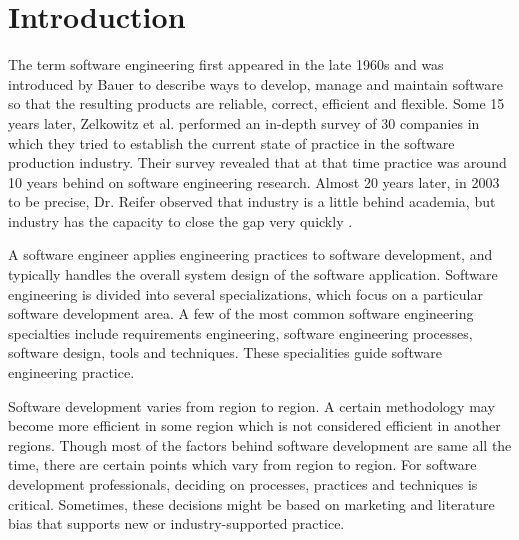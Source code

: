 \section{Introduction}
\label{sec:introduction}
The term software engineering first appeared in the late 1960s and was introduced by Bauer to describe ways to develop, manage and maintain software so that the resulting products are reliable, correct, efficient and flexible. Some 15 years later, Zelkowitz et al. \citep{Zelkowitz1984} performed an in-depth survey of 30 companies in which they tried to establish the current state of practice in the software production industry. Their survey revealed that at that time practice was around 10 years behind on software engineering research. Almost 20 years later, in 2003 to be precise, Dr. Reifer observed that industry is a little behind academia, but industry has the capacity to close the gap very quickly \citep{Reifer2003}.

A software engineer applies engineering practices to software development, and typically handles the overall system design of the software application. Software engineering is divided into several specializations, which focus on a particular software development area. A few of the most common software engineering specialties include requirements engineering, software engineering processes, software design, tools and techniques. These specialities guide software engineering practice.

Software development varies from region to region. A certain methodology may become more efficient in some region which is not considered efficient in another regions. Though most of the factors behind software development are same all the time, there are certain points which vary from region to region. For software development professionals, deciding on processes, practices and techniques is critical. Sometimes, these decisions might be based on marketing and literature bias that supports new or industry-supported practice.

